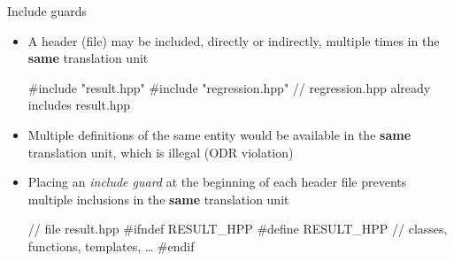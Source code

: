 \begin{frame}[fragile]{Include guards}

  \begin{itemize}[<+->]
  \item A header (file) may be included, directly or indirectly, multiple times
    in the \textbf{same} translation unit
    \begin{codeblock}
#include "result.hpp"
#include "regression.hpp" // regression.hpp already includes result.hpp\end{codeblock}

  \item Multiple definitions of the same entity would be available in the
    \textbf{same} translation unit, which is illegal (ODR violation)
  \item Placing an \textit{include guard} at the beginning of each header file
    prevents multiple inclusions in the \textbf{same} translation unit
    \begin{codeblock}
// file result.hpp
#ifndef RESULT_HPP
#define RESULT_HPP
\ddd
// classes, functions, templates, \ldots
\ddd
#endif\end{codeblock}
  \end{itemize}
\end{frame}

